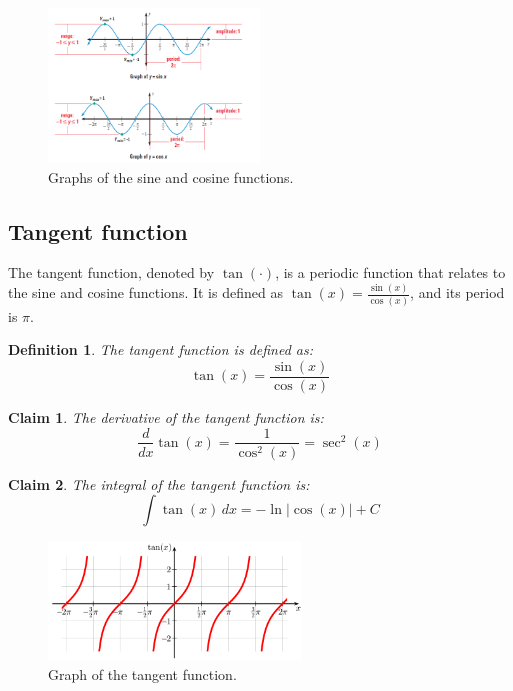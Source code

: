 \documentclass[11pt]{book} %
\newtheorem{definition}{Definition}[section]
\newtheorem*{claim*}{Claim}
\begin{document}
\begin{figure}[h]
    \centering
    \includegraphics[width=0.5\textwidth]{Figs/sin_and_cos.png}
    \caption{Graphs of the sine and cosine functions.}
    \label{fig:sine_cosine}
\end{figure}


\subsection{Tangent function}
The tangent function, denoted by \(\tan(\cdot)\), is a periodic function that relates to the sine and cosine functions.
It is defined as \(\tan(x) = \frac{\sin(x)}{\cos(x)}\), and its period is \(\pi\).

\begin {definition}
    The tangent function is defined as:
    \begin{equation}
        \tan(x) = \frac{\sin(x)}{\cos(x)}
    \end{equation}
\end{definition}

\begin{claim*}
    The derivative of the tangent function is:
    \begin{equation}
        \frac{d}{dx} \tan(x) = \frac{1}{\cos^2(x)} = \sec^2(x)
    \end{equation}
\end{claim*}

\begin{claim*}
    The integral of the tangent function is:
    \begin{equation}
        \int \tan(x) \, dx = -\ln|\cos(x)| + C
    \end{equation}
\end{claim*}

\begin{figure}[h]
    \centering
    \includegraphics[width=0.6\textwidth]{Figs/tangent.png }
    \caption{Graph of the tangent function.}
    \label{fig:tangent}
\end{figure}
\end{document}
